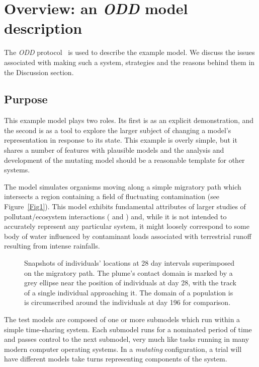 \section{Overview: an {\em{ODD}\/} model description}\label{ODD}

The {\em{ODD}\/} protocol~\citep{Grimm06:1} is used to describe the example
model. We discuss the issues associated with making such a system, strategies
and the reasons behind them in the Discussion section.

\subsection{Purpose}

This example model plays two roles. Its first is as an explicit demonstration,
and the second is as a tool to explore the larger subject of changing a
model's representation in response to its state. This example is overly
simple, but it shares a number of features with plausible models and the
analysis and development of the mutating model should be a reasonable template
for other systems.

The model simulates organisms moving along a simple migratory path which
intersects a region containing a field of fluctuating contamination (see
Figure~\ref{Fig1}). This model exhibits fundamental attributes of larger
studies of pollutant/ecosystem interactions (\citeauthor{Lyne94:1} and
\citeauthor{gray2006nws}) and, while it is not intended to accurately represent any
particular system, it might loosely correspond to some body of water
influenced by contaminant loads associated with terrestrial runoff resulting
from intense rainfalls.

\begin{figure}[h]
  
  \caption{Snapshots of individuals' locations at 28 day intervals
  superimposed on the migratory path. The plume's contact domain is marked by
  a grey ellipse near the position of individuals at day 28, with the track of
  a single individual approaching it. The domain of a population is is
  circumscribed around the individuals at day 196 for comparison.}
\end{figure}\label{Fig1}

The test models are composed of one or more submodels which run within a
simple time-sharing system. Each submodel runs for a nominated period of time
and passes control to the next submodel, very much like tasks running in many
modern computer operating systems. In a {\em{mutating}\/} configuration, a
trial will have different models take turns representing components of the
system.

